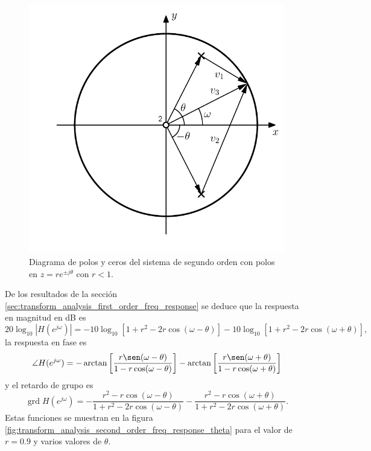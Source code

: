 \documentclass[a4paper]{report}
\DeclareMathOperator{\grd}{grd}
\begin{document}
 \begin{figure}[!htb]
  \begin{minipage}[c]{0.53\textwidth}
    \includegraphics[width=\textwidth]{figuras/transform_analysis_second_order_zplane.pdf}
  \end{minipage}\hfill
  \begin{minipage}[c]{0.38\textwidth}
    \caption{
     Diagrama de polos y ceros del sistema de segundo orden con polos en \(z=re^{\pm j\theta}\) con \(r<1\).
    }\label{fig:transform_analysis_second_order_zplane}
  \end{minipage}
\end{figure}
De los resultados de la sección \ref{sec:transform_analysis_first_order_freq_response} se deduce que la respuesta en magnitud en dB es
\[
 20\log_{10}|H(e^{j\omega})|=-10\log_{10}[1+r^2-2r\cos(\omega-\theta)]-10\log_{10}[1+r^2-2r\cos(\omega+\theta)], 
\]
la respuesta en fase es
\[
  \angle H(e^{j\omega})=-\arctan\left[\frac{r\sen(\omega-\theta)}{1-r\cos(\omega-\theta)}\right]-\arctan\left[\frac{r\sen(\omega+\theta)}{1-r\cos(\omega+\theta)}\right] 
\]
y el retardo de grupo es
\[
 \grd H(e^{j\omega})=-\dfrac{r^2-r\cos(\omega-\theta)}{1+r^2-2r\cos(\omega-\theta)}-\dfrac{r^2-r\cos(\omega+\theta)}{1+r^2-2r\cos(\omega+\theta)}.
\]
Estas funciones se muestran en la figura \ref{fig:transform_analysis_second_order_freq_response_theta} para el valor de \(r=0.9\) y varios valores de \(\theta\).
\end{document}
